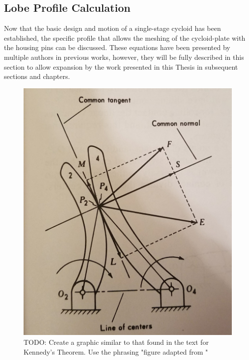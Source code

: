 \subsection{Lobe Profile Calculation} \label{ch:design:basic_calc:profile}

Now that the basic design and motion of a single-stage cycloid has been established, the specific profile that allows the meshing of the cycloid-plate with the housing pins can be discussed. These equations have been presented by multiple authors in previous works, however, they will be fully described in this section to allow expansion by the work presented in this Thesis in subsequent sections and chapters. 

\begin{figure}[h]
   \centering
   \includegraphics[width=0.60\linewidth]{fig/kennedy_sliding_TODO}
   \caption{TODO: Create a graphic similar to that found in the text for Kennedy's Theorem. Use the phrasing "figure adapted from \cite{ref:kinematics_and_dynamics}"}
   \label{fig:kennedy_sliding}
\end{figure}

